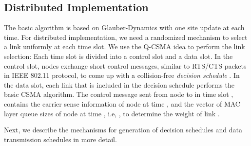 \documentclass[10pt,onecolumn,draftclsnofoot,journal]{IEEEtran}
\begin{document}
\subsection{Distributed Implementation}
The basic algorithm is based on Glauber-Dynamics with one site update at each time. For distributed implementation, we need a randomized mechanism to select a link uniformly at each time slot. We use the Q-CSMA idea \cite{srikant2} to perform the link selection: Each time slot is divided into a control slot and a data slot. In the control slot, nodes exchange short control messages, similar to RTS/CTS packets in IEEE 802.11 protocol, to come up with a collision-free \textit{decision schedule} . In the data slot, each link  that is included in the decision schedule performs the basic CSMA algorithm.
The control message sent from node  to  in time slot , contains the carrier sense information of node  at time , and the vector of MAC layer queue sizes of node  at time , i.e, , to determine the weight of link .

Next, we describe the mechanisms for generation of decision schedules and data transmission schedules in more detail.
\end{document}
